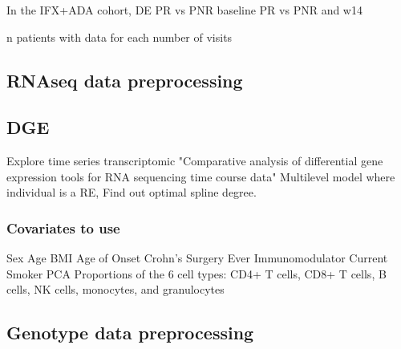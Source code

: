 \begin{outline}
In the IFX+ADA cohort, 
    DE
    PR vs PNR baseline
    PR vs PNR and w14

n patients with data for each number of visits

\subsection{RNAseq data preprocessing}

\subsection{DGE}

Explore time series transcriptomic
    "Comparative analysis of differential gene expression tools for RNA sequencing time course data"
Multilevel model where individual is a RE, 
Find out optimal spline degree.

\subsubsection{Covariates to use}


Sex
Age
BMI
Age of Onset
Crohn’s Surgery
Ever Immunomodulator
Current Smoker
PCA
Proportions of the 6 cell types: CD4+ T cells, CD8+ T cells, B cells, NK cells, monocytes, and granulocytes

\subsection{Genotype data preprocessing}

%
%
%
%


\end{outline}
